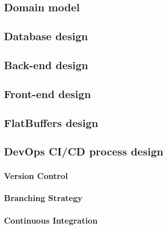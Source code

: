 \documentclass{article}
\begin{document}
    \subsection{Domain model}
    

    \subsection{Database design}

    \subsection{Back-end design}

    \subsection{Front-end design}

    \subsection{FlatBuffers design}

    \subsection{DevOps CI/CD process design} %

        \subsubsection{Version Control}

        \subsubsection{Branching Strategy}

        \subsubsection{Continuous Integration}
\end{document}
